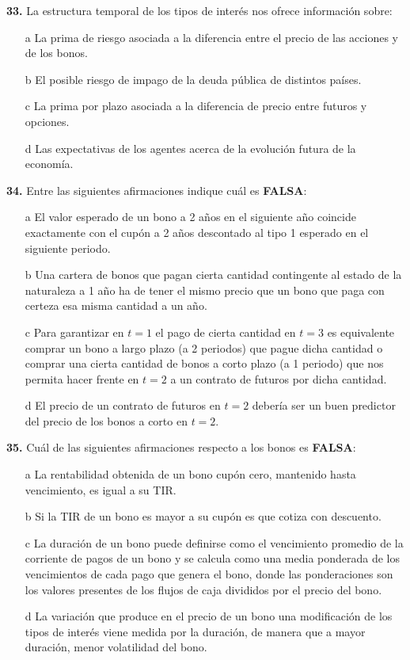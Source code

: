 \documentclass{nuevotema}
\begin{document}
\textbf{33.} La estructura temporal de los tipos de interés nos ofrece información sobre:
\begin{enumerate}
	\item[a] La prima de riesgo asociada a la diferencia entre el precio de las acciones y de los bonos.
	\item[b] El posible riesgo de impago de la deuda pública de distintos países.
	\item[c] La prima por plazo asociada a la diferencia de precio entre futuros y opciones.
	\item[d] Las expectativas de los agentes acerca de la evolución futura de la economía.
\end{enumerate}

\textbf{34.} Entre las siguientes afirmaciones indique cuál es \textbf{FALSA}:
\begin{enumerate}
	\item[a] El valor esperado de un bono a 2 años en el siguiente año coincide exactamente con el cupón a 2 años descontado al tipo 1 esperado en el siguiente periodo.
	\item[b] Una cartera de bonos que pagan cierta cantidad contingente al estado de la naturaleza a 1 año ha de tener el mismo precio que un bono que paga con certeza esa misma cantidad a un año.
	\item[c] Para garantizar en $t=1$ el pago de cierta cantidad en $t=3$ es equivalente comprar un bono a largo plazo (a 2 periodos) que pague dicha cantidad o comprar una cierta cantidad de bonos a corto plazo (a 1 periodo) que nos permita hacer frente en $t=2$ a un contrato de futuros por dicha cantidad.
	\item[d] El precio de un contrato de futuros en $t=2$ debería ser un buen predictor del precio de los bonos a corto en $t=2$.
\end{enumerate}

\textbf{35.} Cuál de las siguientes afirmaciones respecto a los bonos es \textbf{FALSA}:
\begin{enumerate}
	\item[a] La rentabilidad obtenida de un bono cupón cero, mantenido hasta vencimiento, es igual a su TIR.
	\item[b] Si la TIR de un bono es mayor a su cupón es que cotiza con descuento.
	\item[c] La duración de un bono puede definirse como el vencimiento promedio de la corriente de pagos de un bono y se calcula como una media ponderada de los vencimientos de cada pago que genera el bono, donde las ponderaciones son los valores presentes de los flujos de caja divididos por el precio del bono.
	\item[d] La variación que produce en el precio de un bono una modificación de los tipos de interés viene medida por la duración, de manera que a mayor duración, menor volatilidad del bono.
\end{enumerate}
\end{document}
